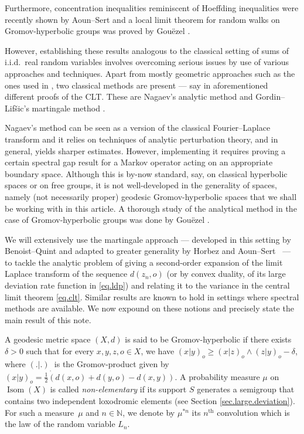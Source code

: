 \documentclass[JEP,XML,SOM,Unicode,published]{cedram}
\theoremstyle{plain}
\theoremstyle{definition}
\newcommand\N{\mathbb{N}}
\DeclareMathOperator\Isom{Isom}
\begin{document}
Furthermore, concentration inequalities reminiscent of Hoeffding inequalities were recently shown by Aoun--Sert \cite{aoun-sert} and a local limit theorem for random walks on Gromov-hyperbolic groups was proved by Gouëzel \cite{gouezel.local}.

However, establishing these results analogous to the classical setting of sums of i.i.d.~real random variables involves overcoming serious issues by use of various approaches and techniques. Apart from mostly geometric approaches such as the ones used in \cite{BMSS,gouezel.first.moment,mathieu-sisto}, two classical methods are present --- say in aforementioned different proofs of the CLT. These are Nagaev's analytic method \cite{nagaev} and Gordin--Lif\v{s}ic's martingale method \cite{martingale.method}.

Nagaev's method can be seen as a version of the classical Fourier--Laplace transform and it relies on techniques of analytic perturbation theory, and in general, yields sharper estimates. However, implementing it requires proving a certain spectral gap result for a Markov operator acting on an appropriate boundary space. Although this is by-now standard, say, on classical hyperbolic spaces or on free groups, it is not well-developed in the generality of spaces, namely (not necessarily proper) geodesic Gromov-hyperbolic spaces that we shall be working with in this article. A thorough study of the analytical method in the case of Gromov-hyperbolic groups was done by Gouëzel \cite[Prop.\,3.6, \S 5]{gouezel.gap}.

We will extensively use the martingale approach --- developed in this setting by Benoist--Quint \cite{BQ.CLT, BQ.hyperbolic} and adapted to greater generality by Horbez \cite{horbez} and Aoun--Sert~\cite{aoun-sert} --- to tackle the analytic problem of giving a second-order expansion of the limit Laplace transform of the sequence $d(z_n,o)$ (or by convex duality, of its large deviation rate function in \eqref{eq.ldp}) and relating it to the variance in the central limit theorem \eqref{eq.clt}. Similar results are known to hold in settings where spectral methods are available. We now expound on these notions and precisely state the main result of this note.

A geodesic metric space $(X,d)$ is said to be Gromov-hyperbolic if there exists $\delta>0$ such that for every $x,y,z,o \in X$, we have $(x|y)_o \geq (x|z)_o \wedge (z|y)_o -\delta$, where $(.|.)_.$ is the Gromov-product given by $(x|y)_o=\frac{1}{2}(d(x,o)+d(y,o)-d(x,y))$. A probability measure $\mu$ on $\Isom(X)$ is called \textit{non-elementary} if its support $S$ generates a semigroup that contains two independent loxodromic elements (see Section \ref{sec.large.deviation}). For such a measure~$\mu$ and $n \in \N$, we denote by $\mu^{\ast n}$ its $n^\mathrm{th}$ convolution which is the law of the random variable $L_n$.
\end{document}

